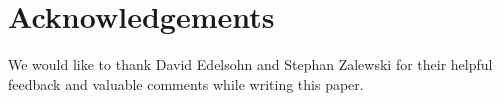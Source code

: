 \documentclass[10pt,preprint]{sigplanconf}
\begin{document}
\section*{Acknowledgements}
We would like to thank David Edelsohn and Stephan Zalewski for their helpful
feedback and valuable comments while writing this paper.

%    


\listoftodos
\end{document}
